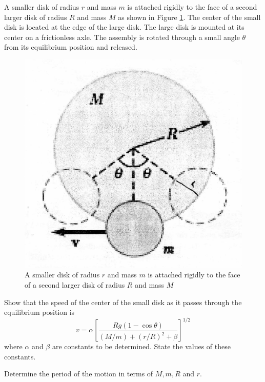 \begin{problem}
    A smaller disk of radius $r$ and mass $m$ is attached rigidly to the face of a second larger disk of radius $R$ and mass $M$ as shown in Figure \ref{2010q6}. The center of the small disk is located at the edge of the large disk. The large disk is mounted at its center on a frictionless axle. The assembly is rotated through a small angle $\theta$ from its equilibrium position and released.
    \begin{figure}[h]
	   \centering
	   \includegraphics[width=0.5\linewidth]{spho_book_TYS_images/2010q6.png}
	   \caption{A smaller disk of radius $r$ and mass $m$ is attached rigidly to the face of a second larger disk of radius $R$ and mass $M$}\label{2010q6}
    \end{figure}
    \begin{subproblem}
        Show that the speed of the center of the small disk as it passes through the equilibrium position is
        \[v=\alpha\left[\frac{R g(1-\cos \theta)}{(M / m)+(r / R)^{2}+\beta}\right]^{1 / 2}\]
        where $\alpha$ and $\beta$ are constants to be determined. State the values of these constants.
    \end{subproblem}
    
    \begin{subproblem}
        Determine the period of the motion in terms of $M, m, R$ and $r$.
    \end{subproblem}
\end{problem}

